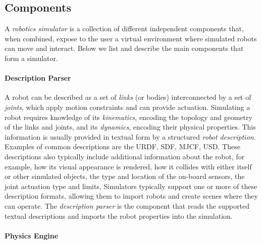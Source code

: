 \begin{addmargin}{0cm}

\subsection{Components}

A \emph{robotics simulator} is a collection of different independent components that, when combined, expose to the user a virtual environment where simulated robots can move and interact.
Below we list and describe the main components that form a simulator.

\paragraph{Description Parser}

A robot can be described as a set of \emph{links} (or bodies) interconnected by a set of \emph{joints}, which apply motion constraints and can provide actuation.
Simulating a robot requires knowledge of its \emph{kinematics}, encoding the topology and geometry of the links and joints, and its \emph{dynamics}, encoding their physical properties.
This information is usually provided in textual form by a structured \emph{robot description}.
Examples of common descriptions are the \ac{URDF}, \ac{SDF}, \ac{MJCF}, \ac{USD}.
These descriptions also typically include additional information about the robot, for example, how its visual appearance is rendered, how it collides with either itself or other simulated objects, the type and location of the on-board sensors, the joint actuation type and limits, \etc
Simulators typically support one or more of these description formats, allowing them to import robots and create scenes where they can operate.
The \emph{description parser} is the component that reads the supported textual descriptions and imports the robot properties into the simulation.

\paragraph{Physics Engine}


\end{addmargin}

